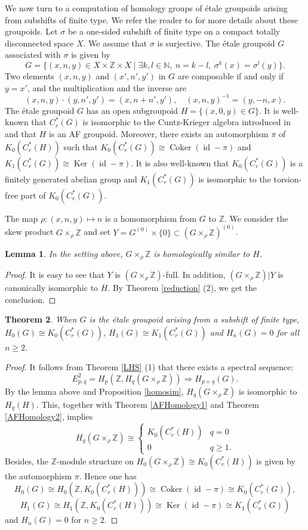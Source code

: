 \documentclass[11pt]{article}
\newtheorem{thm}{Theorem}[section]
\newtheorem{lem}[thm]{Lemma}
\theoremstyle{definition}
\renewcommand{\ker}{\operatorname{Ker}}
\newcommand{\id}{\operatorname{id}}
\newcommand{\Coker}{\operatorname{Coker}}
\newcommand{\N}{\mathbb{N}}
\newcommand{\Z}{\mathbb{Z}}
\begin{document}
We now turn to a computation of homology groups 
of \'etale groupoids arising from subshifts of finite type. 
We refer the reader to \cite{A,R2} 
for more details about these groupoids. 
Let $\sigma$ be a one-sided subshift of finite type 
on a compact totally disconnected space $X$. 
We assume that $\sigma$ is surjective. 
The \'etale groupoid $G$ associated with $\sigma$ is given by 
\[
G=\{(x,n,y)\in X\times\Z\times X\mid
\exists k,l\in\N,\ n=k{-}l,\ \sigma^k(x)=\sigma^l(y)\}. 
\]
Two elements $(x,n,y)$ and $(x',n',y')$ in $G$ are composable 
if and only if $y=x'$, and the multiplication and the inverse are 
\[
(x,n,y)\cdot(y,n',y')=(x,n{+}n',y'),\quad (x,n,y)^{-1}=(y,-n,x). 
\]
The \'etale groupoid $G$ has 
an open subgroupoid $H=\{(x,0,y)\in G\}$. 
It is well-known that 
$C^*_r(G)$ is isomorphic to the Cuntz-Krieger algebra 
introduced in \cite{CK} 
and that $H$ is an AF groupoid. 
Moreover, there exists an automorphism $\pi$ of $K_0(C^*_r(H))$ such that 
$K_0(C^*_r(G))\cong\Coker(\id-\pi)$ and $K_1(C^*_r(G))\cong\ker(\id-\pi)$. 
It is also well-known that 
$K_0(C^*_r(G))$ is a finitely generated abelian group and 
$K_1(C^*_r(G))$ is isomorphic to the torsion-free part of $K_0(C^*_r(G))$. 

The map $\rho:(x,n,y)\mapsto n$ is a homomorphism from $G$ to $\Z$. 
We consider the skew product $G\times_\rho\Z$ and 
set $Y=G^{(0)}\times\{0\}\subset(G\times_\rho\Z)^{(0)}$. 

\begin{lem}
In the setting above, 
$G\times_\rho\Z$ is homologically similar to $H$. 
\end{lem}
\begin{proof}
It is easy to see that $Y$ is $(G\times_\rho\Z)$-full. 
In addition, $(G\times_\rho\Z)|Y$ is canonically isomorphic to $H$. 
By Theorem \ref{reduction} (2), we get the conclusion. 
\end{proof}

\begin{thm}\label{CKHomology}
When $G$ is the \'etale groupoid arising from a subshift of finite type, 
$H_0(G)\cong K_0(C^*_r(G))$, $H_1(G)\cong K_1(C^*_r(G))$ and 
$H_n(G)=0$ for all $n\geq2$. 
\end{thm}
\begin{proof}
It follows from Theorem \ref{LHS} (1) that 
there exists a spectral sequence: 
\[
E^2_{p,q}=H_p(\Z,H_q(G\times_\rho\Z))\Rightarrow
H_{p+q}(G). 
\]
By the lemma above and Proposition \ref{homosim}, 
$H_q(G\times_\rho\Z)$ is isomorphic to $H_q(H)$. 
This, together with Theorem \ref{AFHomology1} and Theorem \ref{AFHomology2}, 
implies 
\[
H_q(G\times_\rho\Z)\cong\begin{cases}K_0(C^*_r(H)) & q=0 \\
0 & q\geq1. \end{cases}
\]
Besides, 
the $\Z$-module structure on $H_0(G\times_\rho\Z)\cong K_0(C^*_r(H))$ is 
given by the automorphism $\pi$. 
Hence one has 
\[
H_0(G)\cong H_0(\Z,K_0(C^*_r(H)))\cong\Coker(\id-\pi)\cong K_0(C^*_r(G)), 
\]
\[
H_1(G)\cong H_1(\Z,K_0(C^*_r(H)))\cong\ker(\id-\pi)\cong K_1(C^*_r(G))
\]
and $H_n(G)=0$ for $n\geq2$. 
\end{proof}
\end{document}
